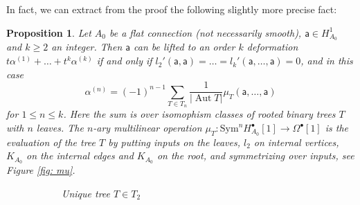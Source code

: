 \documentclass[11pt,a4paper]{amsart}
\theoremstyle{plain} %
\newtheorem{prop}[thm]{Proposition}
\theoremstyle{definition}
\theoremstyle{remark}
\newcommand{\mr}{\mathrm}
\newcommand{\sfa}{\mathsf{a}}
\newcommand{\sfb}{\mathsf{b}}
\newcommand{\sfc}{\mathsf{c}}
\newcommand{\ra}{\rightarrow}
\begin{document}
In fact, we can extract from the proof the following slightly more precise fact:
\begin{prop}
Let $A_0$ be a flat connection (not necessarily smooth), $\sfa \in H^1_{{A_0}}$ and $k \geq 2$ an integer. Then $\sfa$ can be lifted to an order $k$ deformation $t\alpha^{(1)} + \ldots + t^k\alpha^{(k)}$ if and only if $l_2'(\sfa,\sfa) = \ldots =l_k'(\sfa,\ldots,\sfa) = 0$, and in this case 
\begin{equation}\alpha^{(n)} ={ (-1)^{n-1}} \sum_{T \in T_n}{ \frac{1}{|\operatorname{Aut} T|}}\mu_T(\sfa,\ldots,\sfa)\label{eq:alphaj}\end{equation}
for $1\leq n \leq k$. %
Here the sum is over { isomophism classes of} rooted binary trees $T$ with $n$ leaves. 
{
The 
$n$-ary multilinear operation $\mu_T \colon \mr{Sym}^n H^\bullet_{A_0}[1]  \to\Omega^\bullet [1]$ is 
the evaluation of the tree $T$ by putting inputs on the leaves, $l_2$ on internal vertices, $K_{A_0}$ on the internal edges and $K_{A_0}$ on the root, and symmetrizing over inputs, see Figure \ref{fig: mu}. 
}
\begin{figure}
    \centering
    \begin{subfigure}{0.3\textwidth}
    \caption{Unique tree $T \in T_2$}
    \end{subfigure}
    \begin{subfigure}{0.6\textwidth}
    \centering
\end{subfigure}
\end{figure}
\end{prop}
\end{document}
